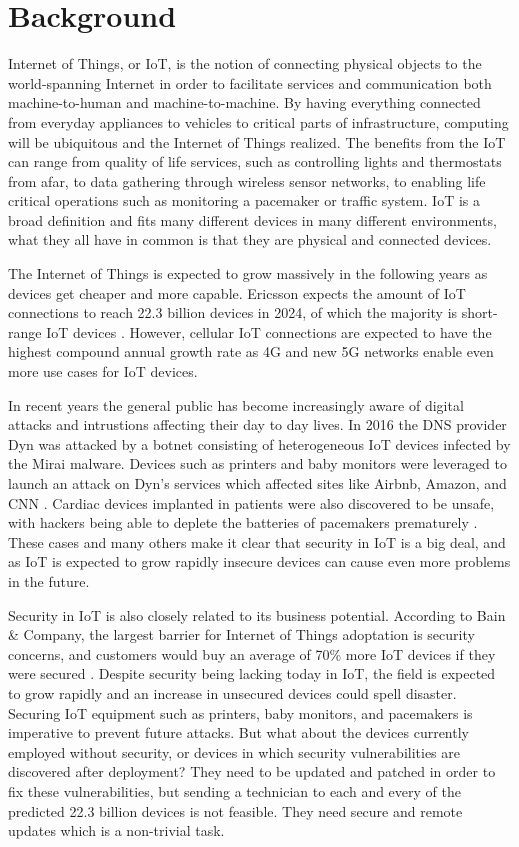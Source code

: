 \documentclass[0-thesis.tex]{subfiles}
\begin{document}
\section{Background}
Internet of Things, or IoT, is the notion of connecting physical objects to the
world-spanning Internet in order to facilitate services and communication both
machine-to-human and machine-to-machine. By having everything connected from everyday
appliances to vehicles to critical parts of infrastructure, computing will be ubiquitous
and the Internet of Things realized. The benefits from the IoT can range from quality of
life services, such as controlling lights and thermostats from afar, to data gathering
through wireless sensor networks, to enabling life critical operations such as monitoring
a pacemaker or traffic system. IoT is a broad definition and fits many different devices
in many different environments, what they all have in common is that they are physical and
connected devices.

The Internet of Things is expected to grow massively in the following years as devices get
cheaper and more capable. Ericsson expects the amount of IoT connections to reach 22.3
billion devices in 2024, of which the majority is short-range IoT devices
\parencite{ericsson-mobility-report}. However, cellular IoT connections are expected to
have the highest compound annual growth rate as 4G and new 5G networks enable even more
use cases for IoT devices.

In recent years the general public has become increasingly aware of digital attacks and
intrustions affecting their day to day lives. In 2016 the DNS provider Dyn was attacked by
a botnet consisting of heterogeneous IoT devices infected by the Mirai malware. Devices
such as printers and baby monitors were leveraged to launch an attack on Dyn's services
which affected sites like Airbnb, Amazon, and CNN \parencite{perlroth_2016}. Cardiac
devices implanted in patients were also discovered to be unsafe, with hackers being able
to deplete the batteries of pacemakers prematurely \parencite{hern_2017}. These cases and
many others make it clear that security in IoT is a big deal, and as IoT is expected to
grow rapidly insecure devices can cause even more problems in the future.

Security in IoT is also closely related to its business potential. According to Bain \&
Company, the largest barrier for Internet of Things adoptation is security concerns, and
customers would buy an average of 70\% more IoT devices if they were secured
\parencite{ali_bosche_ford_2018}. Despite security being lacking today in IoT, the field
is expected to grow rapidly and an increase in unsecured devices could spell disaster.
Securing IoT equipment such as printers, baby monitors, and pacemakers is imperative to
prevent future attacks. But what about the devices currently employed without security, or
devices in which security vulnerabilities are discovered after deployment? They need to be
updated and patched in order to fix these vulnerabilities, but sending a technician to
each and every of the predicted 22.3 billion devices is not feasible. They need secure and
remote updates which is a non-trivial task.
\end{document}
